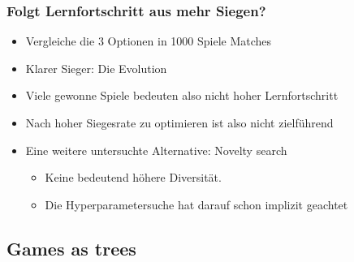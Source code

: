 \begin{frame}
 \frametitle{Folgt Lernfortschritt aus mehr Siegen?}
  


\begin{itemize}
  \item \pause Vergleiche die 3 Optionen in 1000 Spiele Matches
  \item \pause Klarer Sieger: Die Evolution
  \item \pause Viele gewonne Spiele bedeuten also nicht hoher Lernfortschritt
  \item \pause Nach hoher Siegesrate zu optimieren ist also nicht zielführend
  \item \pause Eine weitere untersuchte Alternative: Novelty search
\begin{itemize}
  \item \pause Keine bedeutend höhere Diversität.
  \item \pause Die Hyperparametersuche hat darauf schon implizit geachtet
\end{itemize}
\end{itemize}

  
\end{frame}

\subsection{Games as trees}



